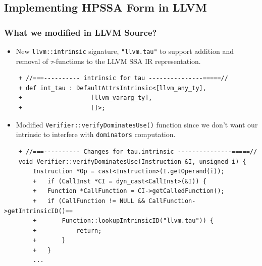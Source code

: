 \documentclass[aspectratio=169, compress]{beamer}
\begin{document}
\subsection{Implementing HPSSA Form in LLVM}

\begin{frame}[fragile]
	\frametitle{What we modified in LLVM Source?}
	\begin{itemize}
		\item New \texttt{llvm::intrinsic} signature, \texttt{"llvm.tau"} to support addition and removal of $\tau$-functions to the LLVM SSA IR representation. \pause
	\end{itemize}
	\begin{verbatim}
	+ //===---------- intrinsic for tau ---------------=====//
	+ def int_tau : DefaultAttrsIntrinsic<[llvm_any_ty],
	+                   [llvm_vararg_ty],
	+                   []>;
	\end{verbatim}
	\pause
	\begin{itemize}
		\item Modified \texttt{Verifier::verifyDominatesUse()} function since we don't want our intrinsic to interfere with \texttt{dominators} computation.  \pause
	\end{itemize}
	\begin{verbatim}
	+ //===---------- Changes for tau.intrinsic ---------------=====//
	void Verifier::verifyDominatesUse(Instruction &I, unsigned i) {
		Instruction *Op = cast<Instruction>(I.getOperand(i));
		+	if (CallInst *CI = dyn_cast<CallInst>(&I)) {
		+	Function *CallFunction = CI->getCalledFunction();
		+	if (CallFunction != NULL && CallFunction->getIntrinsicID()==
		+		Function::lookupIntrinsicID("llvm.tau")) {
		+			return;
		+		}
		+	}
		...
	\end{verbatim}
\end{frame}
\end{document}
